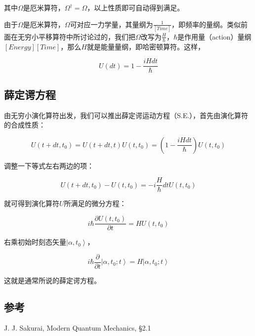 其中$\Omega$是厄米算符，$\Omega^\dagger = \Omega $，以上性质即可自动得到满足。

由于$\Omega$是厄米算符，$\Omega$可对应一力学量，其量纲为$\frac{1}{[Time]}$，即频率的量纲。类似前面在无穷小平移算符中所讨论过的，我们把$\Omega$改写为$\frac{H }{\hbar}$，$\hbar$是作用量（action）量纲$[Energy] [Time]$，那么$H$就是能量量纲，即哈密顿算符。这样，

\begin{equation}
U(dt ) = 1- \frac{i H dt}{\hbar}
\end{equation}

\subsection{薛定谔方程}

由无穷小演化算符出发，我们可以推出薛定谔运动方程（S.E.），首先由演化算符的合成性质：

\begin{equation*}
U(t+dt, t_0) = U(t+ dt , t) U(t, t_0) = \left( 1- \frac{i H dt}{\hbar}  \right) U(t, t_0)
\end{equation*}

调整一下等式左右两边的项：

\begin{equation*}
U(t+dt, t_0) - U(t, t_0) = -  i\frac{H}{\hbar} dt U(t, t_0)
\end{equation*}

就可得到演化算符$U$所满足的微分方程：

\begin{equation}
i \hbar \frac{\partial U(t, t_0) }{\partial t} = H U(t, t_0)
\end{equation}

右乘初始时刻态矢量$\left| \alpha, t_0 \right\rangle$，

\begin{equation}
i \hbar \frac{\partial }{\partial t} \left| \alpha, t_0; t \right\rangle  = H \left| \alpha, t_0; t \right\rangle
\end{equation}

这就是通常所说的薛定谔方程。

\subsection*{参考}

J. J. Sakurai, Modern Quantum Mechanics, \S 2.1